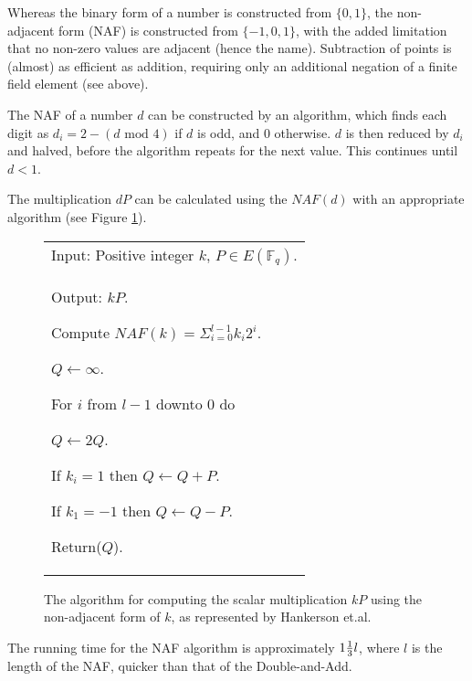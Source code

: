 Whereas the binary form of a number is constructed from \(\{0,1\}\), the non-adjacent form (NAF) is constructed from \(\{-1,0,1\}\), with
the added limitation that no non-zero values are adjacent (hence the name). Subtraction of points is (almost) as efficient as addition,
requiring only an additional negation of a finite field element (see above).

The NAF of a number \(d\) can be constructed by an algorithm, which finds each digit as \(d_i = 2 - (d \text{ mod } 4)\) if \(d\) is odd, and
\(0\) otherwise. \(d\) is then reduced by \(d_i\) and halved, before the algorithm repeats for the next value. This continues until \(d < 1\).

The multiplication \(dP\) can be calculated using the \(NAF(d)\) with an appropriate algorithm (see Figure \ref{fig:naf-algorithm}).\cite{hankerson2010}

\begin{figure}[htb!]
	\centering
	\begin{tabular}{|p{\textwidth}|}
		\hline
		Input: Positive integer \(k\), \(P \in E(\mathbb{F}_q)\). \\
		Output: \(kP\).

		\begin{enumerate*}
			\item Compute \(NAF(k) = \Sigma^{l-1}_{i=0} k_i2^i\).
			\item \(Q \gets \infty\).
			\item For \(i\) from \(l-1\) downto \(0\) do
			\begin{enumerate*}
				\item \(Q \gets 2Q\).
				\item If \(k_i = 1\) then \(Q \gets Q + P\).
				\item If \(k_1 = -1\) then \(Q \gets Q - P\).
			\end{enumerate*}
			\item Return(\(Q\)).
		\end{enumerate*}
		\\
		\hline
	\end{tabular}
	\caption{The algorithm for computing the scalar multiplication \(kP\) using the non-adjacent form of \(k\), as represented by
		Hankerson et.al.\cite{hankerson2010}}
	\label{fig:naf-algorithm}
\end{figure}

The running time for the NAF algorithm is approximately \(1 {1 \over 3} l\), where \(l\) is the length of the NAF, quicker than that
of the Double-and-Add.\cite{hankerson2010}

